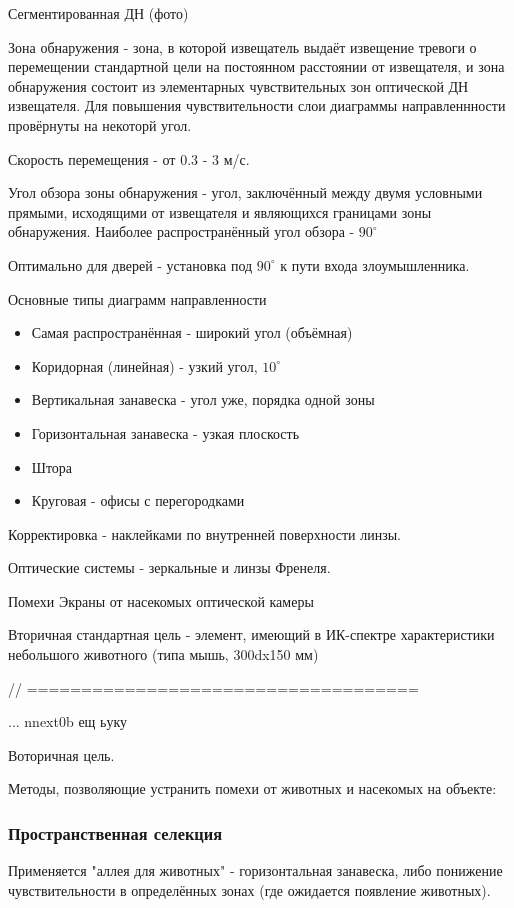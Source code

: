\documentclass[a4paper,12pt]{report}
\begin{document}
	Сегментированная ДН (фото)

	Зона обнаружения - зона, в которой извещатель выдаёт извещение тревоги о перемещении стандартной цели на постоянном расстоянии от извещателя, и зона обнаружения состоит из элементарных чувствительных зон оптической ДН извещателя. Для повышения чувствительности слои диаграммы направленнности провёрнуты на некоторй угол.

	Скорость перемещения - от 0.3 - 3 м/с.

	Угол обзора зоны обнаружения - угол, заключённый между двумя условными прямыми, исходящими от извещателя и являющихся границами зоны обнаружения.
	Наиболее распространённый угол обзора - $90^\circ$

	Оптимально для дверей - установка под $90^\circ$ к пути входа злоумышленника.


	Основные типы диаграмм направленности
	\begin{itemize}
	\item	Самая распространённая - широкий угол (объёмная)
	\item	Коридорная (линейная) - узкий угол, $10^\circ$
	\item	Вертикальная занавеска - угол уже, порядка одной зоны
	\item	Горизонтальная занавеска - узкая плоскость
	\item	Штора
	\item	Круговая - офисы с перегородками
	\end{itemize}

	Корректировка - наклейками по внутренней поверхности линзы.

	Оптические системы - зеркальные и линзы Френеля.

	{Помехи}
		Экраны от насекомых оптической камеры

		Вторичная стандартная цель - элемент, имеющий в ИК-спектре характеристики небольшого животного (типа мышь, 300dx150 мм)


		// ====================================



	... nnext0b ещ ьуку

	Воторичная цель.


	Методы, позволяющие устранить помехи от животных и насекомых на объекте:

	\subsubsection{Пространственная селекция}
	Применяется "аллея для животных" - горизонтальная занавеска, либо понижение чувствительности в определённых зонах (где ожидается появление животных).
\end{document}
